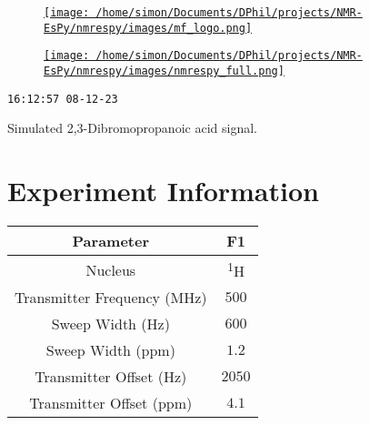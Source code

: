 \documentclass[8pt]{article}
\begin{document}
\begin{figure}[!ht]
\begin{minipage}[b][2.5cm][c]{.72\textwidth}
\href{http://foroozandeh.chem.ox.ac.uk/home}%
{\texttt{[image: /home/simon/Documents/DPhil/projects/NMR-EsPy/nmrespy/images/mf\_logo.png]}}
\end{minipage}
\begin{minipage}[b][2.5cm][c]{.27\textwidth}
\href{https://foroozandehgroup.github.io/NMR-EsPy}%
{\texttt{[image: /home/simon/Documents/DPhil/projects/NMR-EsPy/nmrespy/images/nmrespy\_full.png]}}
\end{minipage}
\end{figure}
\texttt{16:12:57 08-12-23}

Simulated 2,3-Dibromopropanoic acid signal.

\section*{Experiment Information}
\begin{longtable}[l]{c c}
\toprule
Parameter & F1\\
\midrule
Nucleus & \textsuperscript{1}H\\
Transmitter Frequency (MHz) & $\num{500}$\\
Sweep Width (Hz) & $\num{600}$\\
Sweep Width (ppm) & $\num{1.2}$\\
Transmitter Offset (Hz) & $\num{2050}$\\
Transmitter Offset (ppm) & $\num{4.1}$\\
\bottomrule
\end{longtable}
\end{document}
